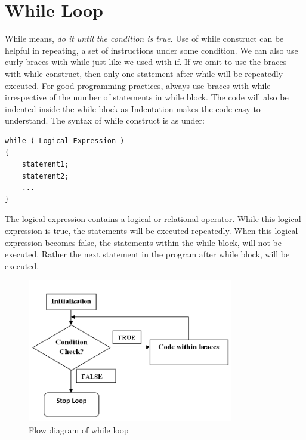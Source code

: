 \documentclass[12pt,a4paper]{article}
\begin{document}
\section{While Loop}
While means, \emph{do it until the condition is true}. Use of while construct can be helpful in repeating, a set of instructions under some condition. We can also use curly braces with while just like we used with if. If we omit to use the braces with while construct, then only one statement after while will be repeatedly executed. For good programming practices, always use braces with while irrespective of the number of statements in while block. The code will also be indented inside the while block as Indentation makes the code easy to understand. 
The syntax of while construct is as under:
\begin{verbatim}
while ( Logical Expression )
{
    statement1;
    statement2;
    ...
}
\end{verbatim}
The logical expression contains a logical or relational operator. While this logical expression is true, the statements will be executed repeatedly. When this logical expression becomes false, the statements within the while block, will not be executed. Rather the next statement in the program after while block, will be executed. 
\begin{figure}[H]
\centering
\label{While-Loop-Flow-Diagram}
\includegraphics[width=0.8\textwidth]{FlowDiagramWhileLoop.png}
\caption{Flow diagram of while loop}
\end{figure}
\end{document}
